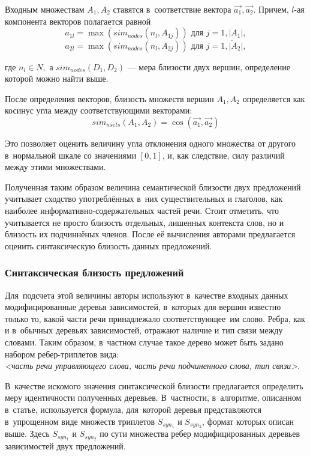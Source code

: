 Входным множествам $A_1,A_2$ ставятся в~соответствие вектора $\vec{a_1},\vec{a_2}$.
Причем, $l$-ая компонента векторов полагается равной 
$$a_{1l} = \max(sim_{nodes}(n_l, A_{1j})) \text{ для } j=\overline{1,|A_1|},$$
$$a_{2l} = \max(sim_{nodes}(n_l, A_{2j})) \text{ для } j=\overline{1,|A_2|},$$

где $n_l \in N, $
а $sim_{nodes}(D_1,D_2)$ --- мера близости двух вершин, определение которой можно найти выше.

После определения векторов, близость множеств вершин $A_1,A_2$ определяется как 
косинус угла между соответствующими векторами:
$$ sim_{nsets}(A_1,A_2) = \cos\left(\vec{a_1},\vec{a_2}\right) $$

Это позволяет оценить величину угла отклонения одного множества от другого в~нормальной шкале
со значениями $[0,1]$, и, как следствие,
 силу различий между этими множествами.

Полученная таким образом величина семантической близости двух предложений
учитывает сходство употреблённых в~них существительных и глаголов,
как наиболее информативно-содержательных частей речи. 
Стоит отметить, что учитывается не просто близость
отдельных, лишенных контекста слов, но и близость их подчиннёных членов. 
После её вычисления авторами предлагается оценить
синтаксическую близость данных предложений.

\subsubsection{Синтаксическая близость предложений}
\label{sec:syntactic_similarity}

Для~подсчета этой величины авторы используют в~качестве входных данных
модифицированные деревья зависимостей, в~которых для вершин известно только то, 
какой части речи принадлежало соответствующее~им слово.
Ребра, как и в~обычных деревьях зависимостей, отражают
наличие и тип связи между словами.
Таким образом, в~частном случае такое дерево может быть задано
набором ребер-триплетов вида: \\
\textit{<часть речи управляющего слова, часть речи подчиненного слова, тип связи>}.

В~качестве искомого значения синтаксической близости предлагается определить меру идентичности полученных деревьев. 
В~частности, в~алгоритме, описанном в~статье,
используется формула, для~которой деревья представляются в~упрощенном виде
множеств триплетов $S_{syn_1}$ и $S_{syn_2}$, формат которых описан выше.
Здесь $S_{syn_1}$ и $S_{syn_2}$ по сути множества ребер 
модифицированных деревьев зависимостей двух предложений.

